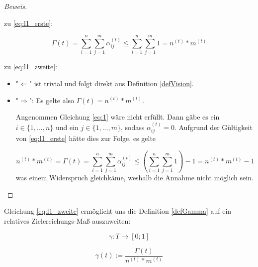 \vspace{0.3cm}

\begin{proof}[Beweis] \textrm{ }

\vspace{0.3cm}

  zu \eqref{eq:l1_erste}: 
  
\begin{equation*}
  \Gamma(t) = \sum_{i=1}^n \sum_{j=1}^m \alpha^{(t)}_{ij} \leq \sum_{i=1}^n \sum_{j=1}^m 1 = n^{(t)} * m^{(t)}
\end{equation*}

\vspace{0.3cm} 

zu \eqref{eq:l1_zweite}: 

\begin{itemize}
  \item "$\Leftarrow$" ist trivial und folgt direkt aus Definition \ref{defVision}.
  \item "$\Rightarrow$": Es gelte also $\Gamma(t) = n^{(t)} * m^{(t)}$.
  
  Angenommen Gleichung \eqref{eq:1} wäre nicht erfüllt. Dann gäbe es ein $i \in \{1,...,n\}$ und ein $j \in \{1,...,m\}$, sodass $\alpha^{(t)}_{ij} = 0$. Aufgrund der Gültigkeit von \eqref{eq:l1_erste} hätte dies zur Folge, es gelte
  
\begin{equation*}
  n^{(t)} * m^{(t)} = \Gamma(t) = \sum_{i=1}^n \sum_{j=1}^m \alpha^{(t)}_{ij} \leq (\sum_{i=1}^n \sum_{j=1}^m 1) - 1 = n^{(t)} * m^{(t)} - 1
\end{equation*}  
was einem Widerspruch gleichkäme, weshalb die Annahme nicht möglich sein.
  
\end{itemize}
  
\end{proof}

\vspace{0.3cm}

Gleichung \eqref{eq:l1_zweite} ermöglicht uns die Definition \ref{defGamma} auf ein relatives Zielereichungs-Maß auszuweiten:

\vspace{0.3cm}

\begin{Def}\label{defKleinGamma}
\begin{equation*}
  \gamma : T \rightarrow [0; 1] 
\end{equation*}

\begin{equation*}
  \gamma(t):= \frac{\Gamma(t)}{n^{(t)} * m^{(t)}}
\end{equation*}

\end{Def}


